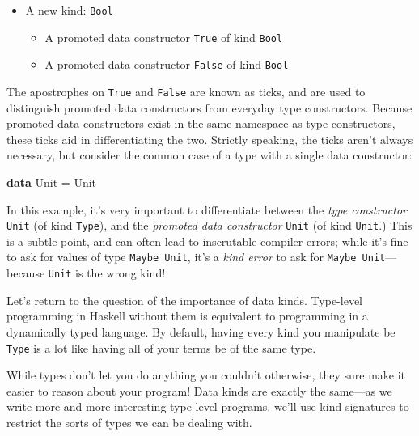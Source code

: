 \documentclass[
  11pt,
]{book}
\newenvironment{Shaded}{}{}
\newcommand{\DataTypeTok}[1]{\textcolor[rgb]{0.56,0.13,0.00}{#1}}
\newcommand{\KeywordTok}[1]{\textcolor[rgb]{0.00,0.44,0.13}{\textbf{#1}}}
\newcommand{\OtherTok}[1]{\textcolor[rgb]{0.00,0.44,0.13}{#1}}
\providecommand{\tightlist}{%
  \setlength{\itemsep}{0pt}\setlength{\parskip}{0pt}}
\theoremstyle{nonumberplain}
\begin{document}
\begin{itemize}
\tightlist
\item
  A new kind: \texttt{Bool}

  \begin{itemize}
  \tightlist
  \item
    A promoted data constructor \texttt{\textquotesingle{}True} of kind
    \texttt{Bool}
  \item
    A promoted data constructor \texttt{\textquotesingle{}False} of kind
    \texttt{Bool}
  \end{itemize}
\end{itemize}

The apostrophes on \texttt{\textquotesingle{}True} and
\texttt{\textquotesingle{}False} are known as ticks, and are used to
distinguish promoted data constructors from everyday type constructors.
Because promoted data constructors exist in the same namespace as type
constructors, these ticks aid in differentiating the two. Strictly
speaking, the ticks aren't always necessary, but consider the common
case of a type with a single data constructor:

\begin{Shaded}
\begin{Highlighting}[]
\KeywordTok{data} \DataTypeTok{Unit} \OtherTok{=} \DataTypeTok{Unit}
\end{Highlighting}
\end{Shaded}

In this example, it's very important to differentiate between the
\emph{type constructor} \texttt{Unit} (of kind \texttt{Type}), and the
\emph{promoted data constructor} \texttt{\textquotesingle{}Unit} (of
kind \texttt{Unit}.) This is a subtle point, and can often lead to
inscrutable compiler errors; while it's fine to ask for values of type
\texttt{Maybe\ Unit}, it's a \emph{kind error} to ask for
\texttt{Maybe\ \textquotesingle{}Unit}---because
\texttt{\textquotesingle{}Unit} is the wrong kind!

Let's return to the question of the importance of data kinds. Type-level
programming in Haskell without them is equivalent to programming in a
dynamically typed language. By default, having every kind you manipulate
be \texttt{Type} is a lot like having all of your terms be of the same
type.

While types don't let you do anything you couldn't otherwise, they sure
make it easier to reason about your program! Data kinds are exactly the
same---as we write more and more interesting type-level programs, we'll
use kind signatures to restrict the sorts of types we can be dealing
with.
\end{document}
